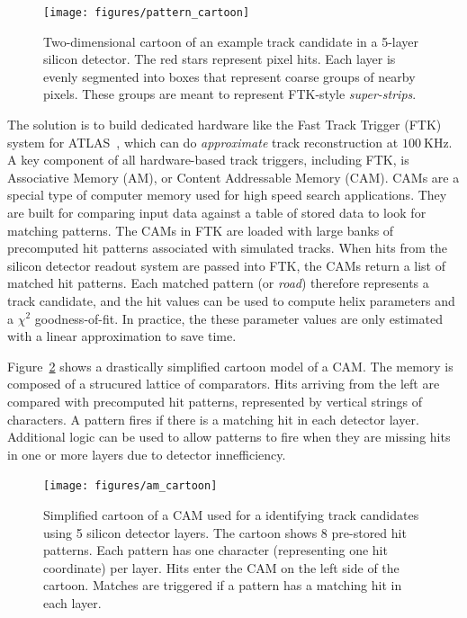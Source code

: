 \documentclass[preprint,prd,showpacs]{revtex4-1}
\newcommand{\khz}{~\mathrm{KHz}}
\begin{document}
\begin{figure}[!htb]
\begin{center}
\texttt{[image: figures/pattern\_cartoon]}
\caption{Two-dimensional cartoon of an example track candidate in a 5-layer silicon detector. The red stars represent pixel hits. Each layer is evenly segmented into boxes that represent coarse groups of nearby pixels. These groups are meant to represent FTK-style \textit{super-strips}.}
\label{fig:pattern_cartoon}
\end{center}
\end{figure}

The solution is to build dedicated hardware like the Fast Track Trigger (FTK) system for ATLAS~\cite{Shochet:1552953}, which can do \textit{approximate} track reconstruction at $100\khz$. A key component of all hardware-based track triggers, including FTK, is Associative Memory (AM), or Content Addressable Memory (CAM). CAMs are a special type of computer memory used for high speed search applications. They are built for comparing input data against a table of stored data to look for matching patterns. The CAMs in FTK are loaded with large banks of precomputed hit patterns associated with simulated tracks. When hits from the silicon detector readout system are passed into FTK, the CAMs return a list of matched hit patterns. Each matched pattern (or \textit{road}) therefore represents a track candidate, and the hit values can be used to compute helix parameters and a $\chi^{2}$ goodness-of-fit. In practice, the these parameter values are only estimated with a linear approximation to save time.

Figure~\ref{fig:am_cartoon} shows a drastically simplified cartoon model of a CAM. The memory is composed of a strucured lattice of comparators. Hits arriving from the left are compared with precomputed hit patterns, represented by vertical strings of characters. A pattern fires if there is a matching hit in each detector layer. Additional logic can be used to allow patterns to fire when they are missing hits in one or more layers due to detector innefficiency.

\begin{figure}[!htb]
\begin{center}
\texttt{[image: figures/am\_cartoon]}
\caption{Simplified cartoon of a CAM used for a identifying track candidates using 5 silicon detector layers. The cartoon shows 8 pre-stored hit patterns. Each pattern has one character (representing one hit coordinate) per layer. Hits enter the CAM on the left side of the cartoon. Matches are triggered if a pattern has a matching hit in each layer.}
\label{fig:am_cartoon}
\end{center}
\end{figure}
\end{document}
